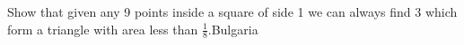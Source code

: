Show that given any 9 points inside a square of side 1 we can always find 3 which form a triangle with area less than $\frac 18$.Bulgaria